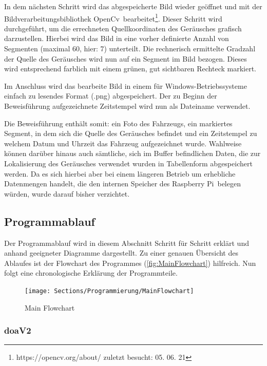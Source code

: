 In dem nächsten Schritt wird das abgespeicherte Bild wieder geöffnet und mit der Bildverarbeitungsbibliothek \glqq OpenCv\grqq\ bearbeitet\footnote{https://opencv.org/about/ zuletzt besucht: 05. 06. 21}. Dieser Schritt wird durchgeführt, um die errechneten Quellkoordinaten des Geräusches grafisch darzustellen. Hierbei wird das Bild in eine vorher definierte Anzahl von Segmenten (maximal 60, hier: 7) unterteilt. Die rechnerisch ermittelte Gradzahl der Quelle des Geräusches wird nun auf ein Segment im Bild bezogen. Dieses wird entsprechend farblich mit einem grünen, gut sichtbaren Rechteck markiert.

Im Anschluss wird das bearbeite Bild in einem für Windows-Betriebssysteme einfach zu lesendes Format (.png) abgespeichert. Der zu Beginn der Beweisführung aufgezeichnete Zeitstempel wird nun als Dateiname verwendet.

Die Beweisführung enthält somit: ein Foto des Fahrzeugs, ein markiertes Segment, in dem sich die Quelle des Geräusches befindet und ein Zeitstempel zu welchem Datum und Uhrzeit das Fahrzeug aufgezeichnet wurde. Wahlweise können darüber hinaus auch sämtliche, sich im Buffer befindlichen Daten, die zur Lokalisierung des Geräusches verwendet wurden in Tabellenform abgespeichert werden. Da es sich hierbei aber bei einem längeren Betrieb um erhebliche Datenmengen handelt, die den internen Speicher des \glqq Raspberry Pi\grqq\ belegen würden, wurde darauf bisher verzichtet. 

\subsection{Programmablauf}

Der Programmablauf wird in diesem Abschnitt Schritt für Schritt erklärt und anhand geeigneter Diagramme dargestellt. Zu einer genauen Übersicht des Ablaufes ist der Flowchart des Programmes (\autoref{fig:MainFlowchart}) hilfreich. Nun folgt eine chronologische Erklärung der Programmteile.

\begin{figure}[!h]
	\begin{center}
		\texttt{[image: Sections/Programmierung/MainFlowchart]}
	\end{center}
	\caption{Main Flowchart}
	\label{fig:MainFlowchart}
\end{figure}


\subsubsection{doaV2}

